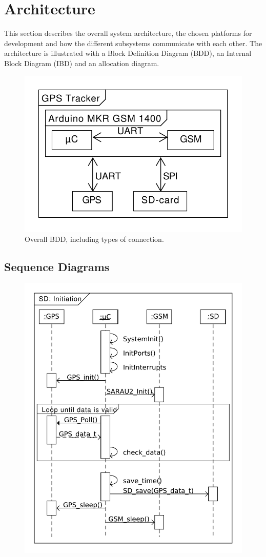 
\chapter{Architecture}
\label{sec:Architecture}
This section describes the overall system architecture, the chosen platforms for development and how the different subsystems communicate with each other.
The architecture is illustrated with a Block Definition Diagram (BDD), an Internal Block Diagram (IBD) and an allocation diagram.

\begin{figure}[H]
	\centering
	\includegraphics[width=0.7\linewidth]{gfx/Design/Overall_IBD.pdf}
	\caption{Overall BDD, including types of connection.}
	\label{fig:BDD:overall}
\end{figure}

\section{Sequence Diagrams}

\begin{figure}
	\centering
	\includegraphics[width=0.7\linewidth]{gfx/Design/SD_init.pdf}
	\caption{}
	\label{fig:SD:init}
\end{figure}

